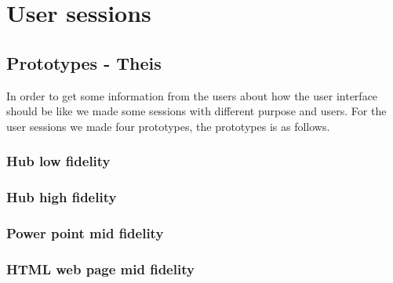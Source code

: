 \chapter{User sessions}
\section{Prototypes - Theis}
In order to get some information from the users about how the user interface should be like we made some sessions with different purpose and users. For the user sessions we made four prototypes, the prototypes is as follows.

\subsection{Hub low fidelity}

\subsection{Hub high fidelity}

\subsection{Power point mid fidelity}

\subsection{HTML web page mid fidelity}


